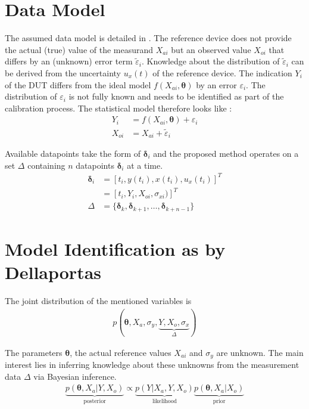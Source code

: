 \documentclass[10pt]{article}
\renewcommand{\vec}[1]{\boldsymbol{#1}}
\begin{document}
    \section{Data Model}
    The assumed data model is detailed in \cite{dellaportas_1995}.
    The reference device does not provide the actual (true) value of the measurand $X_{ai}$ but an observed value $X_{oi}$ that differs by an (unknown) error term $\tilde{\varepsilon}_i$.
    Knowledge about the distribution of $\tilde{\varepsilon}_i$ can be derived from the uncertainty $u_x(t)$ of the reference device.
    The indication $Y_i$ of the DUT differs from the ideal model $f(X_{ai}, \vec{\theta})$ by an error $\varepsilon_i$.
    The distribution of $\varepsilon_i$ is not fully known and needs to be identified as part of the calibration process.
    The statistical model therefore looks like \cite{dellaportas_1995}:
    \begin{align}
        Y_i &= f(X_{ai}, \vec{\theta}) + \varepsilon_i \\
        X_{oi} &= X_{ai} + \tilde{\varepsilon}_i
    \end{align}
    
    Available datapoints take the form of $\vec{\delta}_i$ and the proposed method operates on a set $\Delta$ containing $n$ datapoints $\vec{\delta}_i$ at a time.
    \begin{align}
        \vec{\delta}_i &= [t_i, y(t_i), x(t_i), u_x(t_i)]^T \nonumber \\
                     &= [t_i, Y_i, X_{oi}, \sigma_{xi})]^T \\
        \Delta &= \{\vec{\delta}_k, \vec{\delta}_{k+1}, \dots,  \vec{\delta}_{k+n-1}\} 
    \end{align}
    
    
    \section{Model Identification as by Dellaportas}
    The joint distribution of the mentioned variables is
    \begin{align}
        p(\vec{\theta}, X_a, \sigma_y, \underbrace{Y, X_o, \sigma_x}_{\Delta})
    \end{align}
    
    The parameters $\vec{\theta}$, the actual reference values $X_{ai}$ and $\sigma_{y}$ are unknown.
    The main interest lies in inferring knowledge about these unknowns from the measurement data $\Delta$ via Bayesian inference.
    \begin{align}
        \underbrace{p(\vec{\theta}, X_a | Y, X_o)}_{\text{posterior}} \propto \underbrace{p(Y | X_a, Y, X_o)}_{\text{likelihood}} \underbrace{p(\vec{\theta}, X_a | X_o)}_{\text{prior}}
    \end{align}
    
\end{document}
